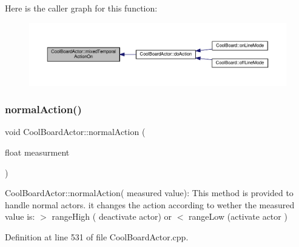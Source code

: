 Here is the caller graph for this function\+:\nopagebreak
\begin{figure}[H]
\begin{center}
\leavevmode
\includegraphics[width=350pt]{dc/d69/class_cool_board_actor_a216aa7a0cfd1f31d0025cc91c2ecd5dd_icgraph}
\end{center}
\end{figure}
\mbox{\label{class_cool_board_actor_a81229abf5895f4d3b0355050b822b438}} 
\subsubsection{\texorpdfstring{normal\+Action()}{normalAction()}}
{\footnotesize\ttfamily void Cool\+Board\+Actor\+::normal\+Action (\begin{DoxyParamCaption}\item[{float}]{measurment }\end{DoxyParamCaption})}

Cool\+Board\+Actor\+::normal\+Action( measured value)\+: This method is provided to handle normal actors. it changes the action according to wether the measured value is\+: $>$ range\+High ( deactivate actor) or $<$ range\+Low (activate actor ) 

Definition at line 531 of file Cool\+Board\+Actor.\+cpp.


